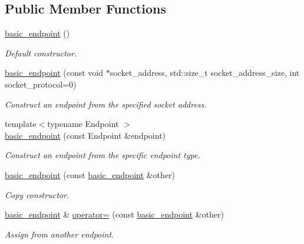 \subsection*{Public Member Functions}
\begin{DoxyCompactItemize}
\item 
\hyperlink{classasio_1_1generic_1_1basic__endpoint_a55b881fcf8b37458cbae9b2bc23bde66}{basic\+\_\+endpoint} ()
\begin{DoxyCompactList}\small\item\em Default constructor. \end{DoxyCompactList}\item 
\hyperlink{classasio_1_1generic_1_1basic__endpoint_a657baa993f97965191eb0a46f4932a00}{basic\+\_\+endpoint} (const void $\ast$socket\+\_\+address, std\+::size\+\_\+t socket\+\_\+address\+\_\+size, int socket\+\_\+protocol=0)
\begin{DoxyCompactList}\small\item\em Construct an endpoint from the specified socket address. \end{DoxyCompactList}\item 
{\footnotesize template$<$typename Endpoint $>$ }\\\hyperlink{classasio_1_1generic_1_1basic__endpoint_a3e8ee2d3caf0c8a7b9d17dc3af5ed0d7}{basic\+\_\+endpoint} (const Endpoint \&endpoint)
\begin{DoxyCompactList}\small\item\em Construct an endpoint from the specific endpoint type. \end{DoxyCompactList}\item 
\hyperlink{classasio_1_1generic_1_1basic__endpoint_aabeef6b7a53e3c072f07b4a7929a2149}{basic\+\_\+endpoint} (const \hyperlink{classasio_1_1generic_1_1basic__endpoint}{basic\+\_\+endpoint} \&other)
\begin{DoxyCompactList}\small\item\em Copy constructor. \end{DoxyCompactList}\item 
\hyperlink{classasio_1_1generic_1_1basic__endpoint}{basic\+\_\+endpoint} \& \hyperlink{classasio_1_1generic_1_1basic__endpoint_a06062afad26ce2cedbc97483bfa77ef3}{operator=} (const \hyperlink{classasio_1_1generic_1_1basic__endpoint}{basic\+\_\+endpoint} \&other)
\begin{DoxyCompactList}\small\item\em Assign from another endpoint. \end{DoxyCompactList}\item 

\end{DoxyCompactItemize}
